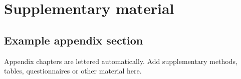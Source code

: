 \chapter{Supplementary material}

\section{Example appendix section}
Appendix chapters are lettered automatically. Add supplementary methods, tables,
questionnaires or other material here.
